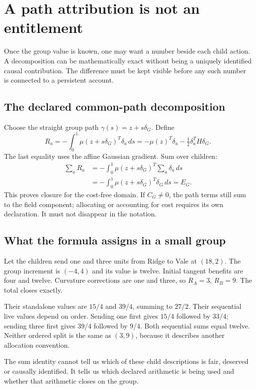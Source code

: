 \chapter{A path attribution is not an entitlement}\label{ch:attribution}
Once the group value is known, one may want a number beside each child
action. A decomposition can be mathematically exact without being a uniquely
identified causal contribution. The difference must be kept visible before
any such number is connected to a persistent account.

\section{The declared common-path decomposition}
Choose the straight group path $\gamma(s)=z+s\delta_G$. Define
\begin{equation}\label{eq:attribution}
 R_a=-\int_0^1\mu(z+s\delta_G)^T\delta_a\,ds
     =-\mu(z)^T\delta_a-\tfrac12\delta_a^TH\delta_G.
\end{equation}
The last equality uses the affine Gaussian gradient. Sum over children:
\begin{align}
 \sum_aR_a
 &=-\int_0^1\mu(z+s\delta_G)^T\sum_a\delta_a\,ds\\
 &=-\int_0^1\mu(z+s\delta_G)^T\delta_G\,ds=E_G.
\end{align}
This proves closure for the cost-free domain. If $C_G\ne0$, the path
terms still sum to the field component; allocating or accounting for cost
requires its own declaration. It must not disappear in the notation.

\section{What the formula assigns in a small group}
Let the children send one and three units from Ridge to Vale at $(18,2)$.
The group increment is $(-4,4)$ and its value is twelve. Initial tangent
benefits are four and twelve. Curvature corrections are one and three, so
$R_A=3$, $R_B=9$. The total closes exactly.

Their standalone values are $15/4$ and $39/4$, summing to $27/2$.
Their sequential live values depend on order. Sending one first gives
$15/4$ followed by $33/4$; sending three first gives $39/4$ followed by
$9/4$. Both sequential sums equal twelve. Neither ordered split is the
same as $(3,9)$, because it describes another allocation convention.

The sum identity cannot tell us which of these child descriptions is fair,
deserved or causally identified. It tells us which declared arithmetic is
being used and whether that arithmetic closes on the group.

